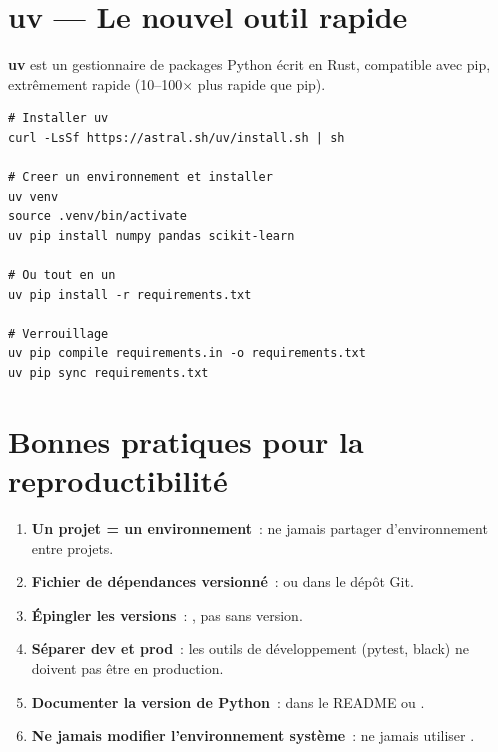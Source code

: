 \section{uv --- Le nouvel outil rapide}
\label{sec:uv}

\textbf{uv} est un gestionnaire de packages Python \'ecrit en Rust,
compatible avec pip, extr\^emement rapide (10--100$\times$ plus rapide
que pip).

\begin{codeblock}[title=\textbf{Workflow uv}]
\begin{verbatim}
# Installer uv
curl -LsSf https://astral.sh/uv/install.sh | sh

# Creer un environnement et installer
uv venv
source .venv/bin/activate
uv pip install numpy pandas scikit-learn

# Ou tout en un
uv pip install -r requirements.txt

# Verrouillage
uv pip compile requirements.in -o requirements.txt
uv pip sync requirements.txt
\end{verbatim}
\end{codeblock}

\section{Bonnes pratiques pour la reproductibilit\'e}
\label{sec:env-best-practices}

\begin{bonnepratique}[title=\textbf{R\`egles d'or pour les environnements}]
\begin{enumerate}
  \item \textbf{Un projet = un environnement}~: ne jamais partager
    d'environnement entre projets.
  \item \textbf{Fichier de d\'ependances versionn\'e}~: 
    ou  dans le d\'ep\^ot Git.
  \item \textbf{\'Epingler les versions}~: , pas
     sans version.
  \item \textbf{S\'eparer dev et prod}~: les outils de d\'eveloppement
    (pytest, black) ne doivent pas \^etre en production.
  \item \textbf{Documenter la version de Python}~: dans le README ou
    .
  \item \textbf{Ne jamais modifier l'environnement syst\`eme}~: ne jamais
    utiliser .
\end{enumerate}
\end{bonnepratique}

